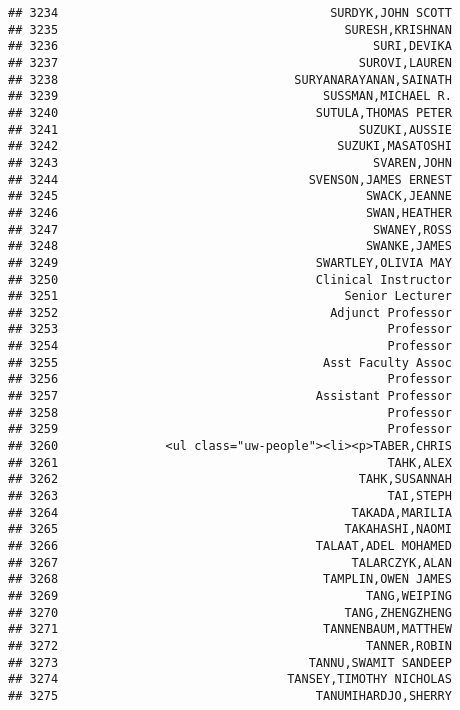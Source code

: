 \documentclass[
]{article}
\begin{document}
\begin{verbatim}
## 3234                                      SURDYK,JOHN SCOTT
## 3235                                        SURESH,KRISHNAN
## 3236                                            SURI,DEVIKA
## 3237                                          SUROVI,LAUREN
## 3238                                 SURYANARAYANAN,SAINATH
## 3239                                     SUSSMAN,MICHAEL R.
## 3240                                    SUTULA,THOMAS PETER
## 3241                                          SUZUKI,AUSSIE
## 3242                                       SUZUKI,MASATOSHI
## 3243                                            SVAREN,JOHN
## 3244                                   SVENSON,JAMES ERNEST
## 3245                                           SWACK,JEANNE
## 3246                                           SWAN,HEATHER
## 3247                                            SWANEY,ROSS
## 3248                                           SWANKE,JAMES
## 3249                                    SWARTLEY,OLIVIA MAY
## 3250                                    Clinical Instructor
## 3251                                        Senior Lecturer
## 3252                                      Adjunct Professor
## 3253                                              Professor
## 3254                                              Professor
## 3255                                     Asst Faculty Assoc
## 3256                                              Professor
## 3257                                    Assistant Professor
## 3258                                              Professor
## 3259                                              Professor
## 3260               <ul class="uw-people"><li><p>TABER,CHRIS
## 3261                                              TAHK,ALEX
## 3262                                          TAHK,SUSANNAH
## 3263                                              TAI,STEPH
## 3264                                         TAKADA,MARILIA
## 3265                                        TAKAHASHI,NAOMI
## 3266                                    TALAAT,ADEL MOHAMED
## 3267                                         TALARCZYK,ALAN
## 3268                                     TAMPLIN,OWEN JAMES
## 3269                                           TANG,WEIPING
## 3270                                        TANG,ZHENGZHENG
## 3271                                     TANNENBAUM,MATTHEW
## 3272                                           TANNER,ROBIN
## 3273                                   TANNU,SWAMIT SANDEEP
## 3274                                TANSEY,TIMOTHY NICHOLAS
## 3275                                    TANUMIHARDJO,SHERRY

\end{verbatim}
\end{document}

